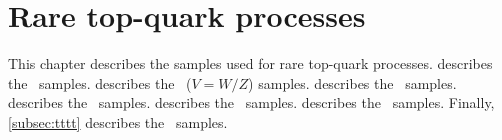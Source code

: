 \chapter{Rare top-quark processes}

This chapter describes the samples used for rare top-quark processes.
 describes the \ttH\ samples.
 describes the \ttV\ ($V=W/Z$) samples.
 describes the \ttgamma\ samples.
 describes the \tH\ samples.
 describes the \tZq\ samples.
 describes the \tWZ\ samples.
Finally, \cref{subsec:tttt} describes the \tttt\ samples.








%

